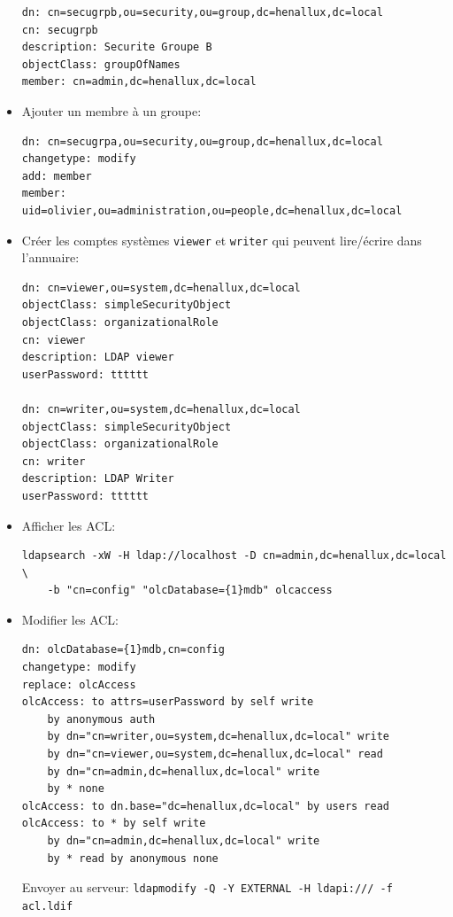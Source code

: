 \documentclass[a4paper]{article}
\begin{document}
\begin{itemize}
\begin{example}
\begin{verbatim}
dn: cn=secugrpb,ou=security,ou=group,dc=henallux,dc=local
cn: secugrpb
description: Securite Groupe B
objectClass: groupOfNames
member: cn=admin,dc=henallux,dc=local
\end{verbatim} \end{example}


\item Ajouter un membre à un groupe:
\begin{example} \begin{verbatim}
dn: cn=secugrpa,ou=security,ou=group,dc=henallux,dc=local
changetype: modify
add: member
member: uid=olivier,ou=administration,ou=people,dc=henallux,dc=local
\end{verbatim} \end{example}


\item Créer les comptes systèmes \texttt{viewer} et \texttt{writer} qui peuvent lire/écrire dans l'annuaire:
\begin{example} \begin{verbatim}
dn: cn=viewer,ou=system,dc=henallux,dc=local
objectClass: simpleSecurityObject
objectClass: organizationalRole
cn: viewer
description: LDAP viewer
userPassword: tttttt

dn: cn=writer,ou=system,dc=henallux,dc=local
objectClass: simpleSecurityObject
objectClass: organizationalRole
cn: writer
description: LDAP Writer
userPassword: tttttt
\end{verbatim} \end{example}


\item Afficher les ACL:
\begin{example} \begin{verbatim}
ldapsearch -xW -H ldap://localhost -D cn=admin,dc=henallux,dc=local \
    -b "cn=config" "olcDatabase={1}mdb" olcaccess
\end{verbatim} \end{example}


\item Modifier les ACL:
\begin{example} \begin{verbatim}
dn: olcDatabase={1}mdb,cn=config
changetype: modify
replace: olcAccess
olcAccess: to attrs=userPassword by self write
    by anonymous auth
    by dn="cn=writer,ou=system,dc=henallux,dc=local" write
    by dn="cn=viewer,ou=system,dc=henallux,dc=local" read
    by dn="cn=admin,dc=henallux,dc=local" write
    by * none
olcAccess: to dn.base="dc=henallux,dc=local" by users read
olcAccess: to * by self write
    by dn="cn=admin,dc=henallux,dc=local" write
    by * read by anonymous none
\end{verbatim} \end{example}
Envoyer au serveur: \texttt{ldapmodify -Q -Y EXTERNAL -H ldapi:/// -f acl.ldif}



\end{itemize}
\end{document}
